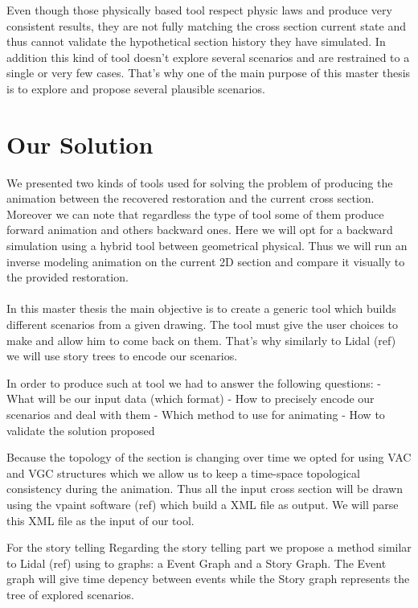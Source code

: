 \documentclass[12pt, a4paper]{memoir} %
\begin{document}
Even though those physically based tool respect physic laws and produce very consistent results, they are not fully matching the cross section current state and thus cannot validate the hypothetical section history they have simulated. In addition this kind of tool doesn't explore several scenarios and are restrained to a single or very few cases. 
That's why one of the main purpose of this master thesis is to explore and propose several plausible scenarios.

\section{Our Solution}

We presented two kinds of tools used for solving the problem of producing the animation between the recovered restoration and the current cross section. Moreover we can note that regardless the type of tool some of them produce forward animation and others backward ones. 
Here we will opt for a backward simulation using a hybrid tool between geometrical physical.
Thus we will run an inverse modeling animation on the current 2D section and compare it visually to the provided restoration.\\\\

In this master thesis the main objective is to create a generic tool which builds different scenarios from a given drawing. The tool must give the user choices to make and allow him to come back on them. That's why similarly to Lidal (ref) we will use story trees to encode our scenarios.

In order to produce such at tool we had to answer the following questions:
- What will be our input data (which format)
- How to precisely encode our scenarios and deal with them
- Which method to use for animating
- How to validate the solution proposed

Because the topology of the section is changing over time we opted for using VAC and VGC structures which we allow us to keep a time-space topological consistency during the animation.  Thus all the input cross section will be drawn using the vpaint software (ref) which build a XML file as output. We will parse this XML file as the input of our tool.

For the story telling 
Regarding the story telling part we propose a method similar to Lidal (ref) using to graphs: a Event Graph and a Story Graph.
The Event graph will give time depency between events while the Story graph  represents the tree of explored scenarios.
\end{document}
